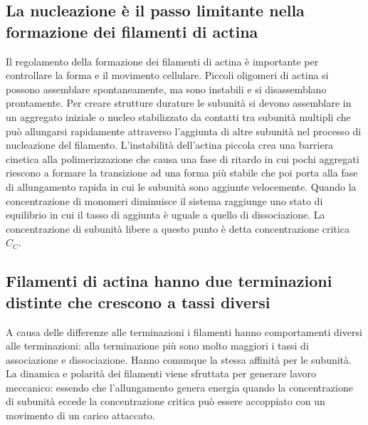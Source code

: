 \subsection{La nucleazione \`e il passo limitante nella formazione dei filamenti di actina}
Il regolamento della formazione dei filamenti di actina \`e importante per controllare la forma e il movimento cellulare. Piccoli oligomeri di actina si possono assemblare 
spontaneamente, ma sono instabili e si disassemblano prontamente. Per creare strutture durature le subunit\`a si devono assemblare in un aggregato iniziale o nucleo stabilizzato da
contatti tra subunit\`a multipli che pu\`o allungarsi rapidamente attraverso l'aggiunta di altre subunit\`a nel processo di nucleazione del filamento. L'instabilit\`a dell'actina 
piccola crea una barriera cinetica alla polimerizzazione che causa una fase di ritardo in cui pochi aggregati riescono a formare la transizione ad una forma pi\`u stabile che poi porta
alla fase di allungamento rapida in cui le subunit\`a sono aggiunte velocemente. Quando la concentrazione di monomeri diminuisce il sistema raggiunge uno stato di equilibrio in cui 
il tasso di aggiunta \`e uguale a quello di dissociazione. La concentrazione di subunit\`a libere a questo punto \`e detta concentrazione critica $C_C$.
\subsection{Filamenti di actina hanno due terminazioni distinte che crescono a tassi diversi}
A causa delle differenze alle terminazioni i filamenti hanno comportamenti diversi alle terminazioni: alla terminazione pi\`u sono molto maggiori i tassi di associazione e dissociazione.
Hanno comunque la stessa affinit\`a per le subunit\`a. La dinamica e polarit\`a dei filamenti viene sfruttata per generare lavoro meccanico: essendo che l'allungamento genera energia
quando la concentrazione di subunit\`a eccede la concentrazione critica pu\`o essere accoppiato con un movimento di un carico attaccato. 
